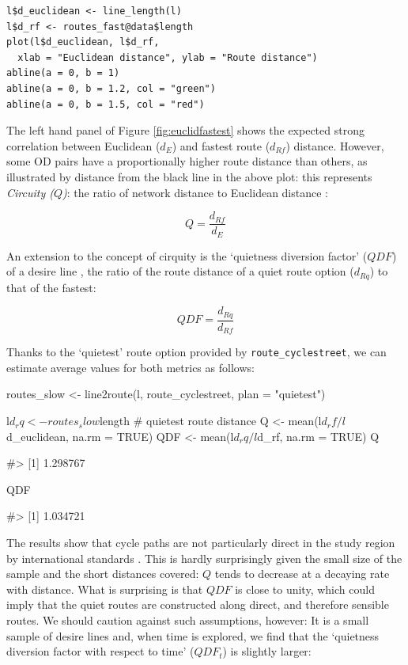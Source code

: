 \begin{verbatim}
l$d_euclidean <- line_length(l)
l$d_rf <- routes_fast@data$length
plot(l$d_euclidean, l$d_rf,
  xlab = "Euclidean distance", ylab = "Route distance")
abline(a = 0, b = 1)
abline(a = 0, b = 1.2, col = "green")
abline(a = 0, b = 1.5, col = "red")
\end{verbatim}

The left hand panel of Figure \ref{fig:euclidfastest} shows the expected
strong correlation between Euclidean (\(d_E\)) and fastest route
(\(d_{Rf}\)) distance. However, some OD pairs have a proportionally
higher route distance than others, as illustrated by distance from the
black line in the above plot: this represents \emph{Circuity ($Q$)}: the
ratio of network distance to Euclidean distance
\citep{levinson_minimum_2009}:

\[
 Q = \frac{d_{Rf}}{d_E}
\]

An extension to the concept of cirquity is the `quietness diversion
factor' (\(QDF\)) of a desire line \citep{lovelace_propensity_2016}, the
ratio of the route distance of a quiet route option (\(d_{Rq}\)) to that
of the fastest:

\[
 QDF = \frac{d_{Rq}}{d_{Rf}}
\]

Thanks to the `quietest' route option provided by
\texttt{route\_cyclestreet}, we can estimate average values for both
metrics as follows:

\begin{Schunk}
\begin{Sinput}
routes_slow <- line2route(l, route_cyclestreet, plan = "quietest")
\end{Sinput}
\end{Schunk}

\begin{Schunk}
\begin{Sinput}
l$d_rq <- routes_slow$length # quietest route distance
Q <- mean(l$d_rf / l$d_euclidean, na.rm = TRUE)
QDF <- mean(l$d_rq / l$d_rf, na.rm = TRUE)
Q
\end{Sinput}
\begin{Soutput}
#> [1] 1.298767
\end{Soutput}
\begin{Sinput}
QDF
\end{Sinput}
\begin{Soutput}
#> [1] 1.034721
\end{Soutput}
\end{Schunk}

The results show that cycle paths are not particularly direct in the
study region by international standards \citep{crow_design_2007}. This
is hardly surprisingly given the small size of the sample and the short
distances covered: \(Q\) tends to decrease at a decaying rate with
distance. What is surprising is that \(QDF\) is close to unity, which
could imply that the quiet routes are constructed along direct, and
therefore sensible routes. We should caution against such assumptions,
however: It is a small sample of desire lines and, when time is
explored, we find that the `quietness diversion factor with respect to
time' (\(QDF_t\)) is slightly larger:

